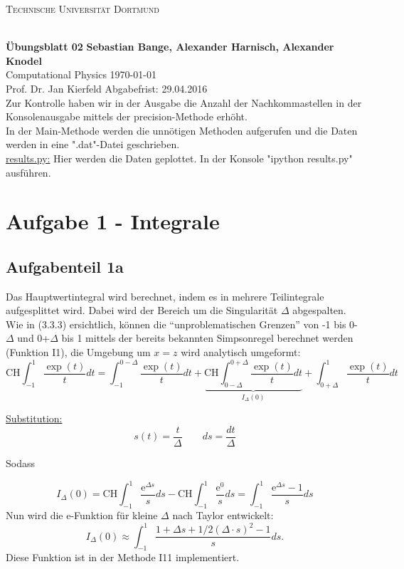 
\usepackage{hyperref}

\noindent
\centerline{\small{\textsc{Technische Universität Dortmund}}} \\
\large\textbf{Übungsblatt 02} \hfill \footnotesize\textbf{Sebastian Bange, Alexander Harnisch, Alexander Knodel} \\
\normalsize Computational Physics \hfill \today \\
Prof. Dr. Jan Kierfeld \hfill Abgabefrist: 29.04.2016\\
\noindent\makebox[\linewidth]{\rule{\textwidth}{0.4pt}}
Zur Kontrolle haben wir in der Ausgabe die Anzahl der Nachkommastellen in der Konsolenausgabe mittels der precision-Methode erhöht.\\
In der Main-Methode werden die unnötigen Methoden aufgerufen und die Daten werden in eine ".dat"-Datei geschrieben. \\
\underline{results.py:}
Hier werden die Daten geplottet. In der Konsole "ipython results.py" ausführen.
\section*{Aufgabe 1 - Integrale}
\subsection*{Aufgabenteil 1a}
Das Hauptwertintegral wird berechnet, indem es in mehrere Teilintegrale aufgesplittet wird. Dabei
wird der Bereich um die Singularität $\Delta$ abgespalten. Wie in (3.3.3)\cite[39]{script} ersichtlich, können
die \enquote{unproblematischen Grenzen} von -1 bis 0-$\Delta$ und 0+$\Delta$ bis 1 mittels der
bereits bekannten Simpsonregel berechnet werden (Funktion I1), die Umgebung um $x = z$ wird
analytisch umgeformt: \begin{equation*}
\text{CH} \int_{-1}^{1} \frac{\exp(t)}{t} dt = \int_{-1}^{0-\Delta}\frac{\exp(t)}{t}dt+\underbrace{\text{CH}\int_{0-\Delta}^{0+\Delta}\frac{\exp(t)}{t}dt}_{I_{\Delta}(0)}+\int_{0+\Delta}^1\frac{\exp(t)}{t}dt
\end{equation*}

\underline{Substitution:}
\begin{equation*}
s(t) = \frac{t}{\Delta} \qquad ds = \frac{dt}{\Delta}
\end{equation*}

Sodass

\begin{equation*}
I_{\Delta}(0) = \text{CH} \int_{-1}^{1} \frac{\mathup{e}^{\Delta s}}{s} ds - \text{CH} \int_{-1}^1 \frac{\mathup{e}^0}{s} ds = \int_{-1}^{1} \frac{\mathup{e}^{\Delta s}-1}{s} ds
\end{equation*}
Nun wird die e-Funktion für kleine $\Delta$ nach Taylor entwickelt:
\begin{equation*}
I_{\Delta}(0) \approx \int_{-1}^{1} \frac{1+\Delta s + 1/2 \left(\Delta \cdot s\right)^2 -1}{s} ds.
\end{equation*}
Diese Funktion ist in der Methode I11 implementiert.

